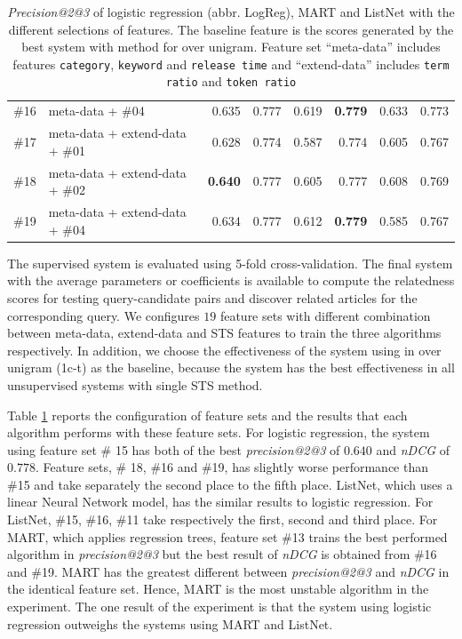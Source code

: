 \begin{table}[!hbt]
{\begin{tabularx}{1\textwidth}{lX|rr|rr|rr}
\#16 & meta-data + \#04 & 0.635 & 0.777 & 0.619 & \textbf{0.779} & 0.633 & 0.773\\
\#17 & meta-data + extend-data + \#01 & 0.628 & 0.774 & 0.587 & 0.774 & 0.605 & 0.767\\
\#18 & meta-data + extend-data + \#02 & \textbf{0.640} &  0.777 & 0.605 & 0.777 & 0.608 & 0.769\\
\#19 & meta-data + extend-data + \#04 & 0.634 & 0.777 & 0.612 & \textbf{0.779} & 0.585 & 0.767 \\ \hline
\end{tabularx}
}
\caption[\textit{Precision@2@3} and \textit{nDCG} of logistic regression, MART and ListNet with the different selections of features in 5-fold cross validation]{\textit{Precision@2@3} of logistic regression (abbr. LogReg), MART and ListNet with the different selections of features. The baseline feature is the scores generated by the best system with method \tfidf{} for \icontent{} over unigram. Feature set ``meta-data'' includes features \texttt{category}, \texttt{keyword} and \texttt{release time} and ``extend-data'' includes \texttt{term ratio} and \texttt{token ratio}}
\label{tab:supervised}
\end{table}


The supervised system is evaluated using 5-fold cross-validation. The final system with the average parameters or coefficients is available to compute the relatedness scores for testing query-candidate pairs and discover related articles for the corresponding query. We configures $19$ feature sets with different combination between meta-data, extend-data and STS features to train the three algorithms  respectively. In addition, we choose the effectiveness of the system using \tfidf{} in \icontent{} over unigram (1c-t) as the baseline, because the system has the best effectiveness in all unsupervised systems with single STS method. 

Table \ref{tab:supervised} reports the configuration of feature sets and the results that each algorithm performs with these feature sets. For logistic regression, the system using feature set \# 15 has both of the best \textit{precision@2@3} of $0.640$ and \textit{nDCG} of $0.778$. Feature sets, \# 18, \#16 and \#19, has slightly worse performance than \#15 and take separately the second place to the fifth place. ListNet, which uses a linear Neural Network model, has the similar results to logistic regression. For ListNet, \#15, \#16, \#11 take respectively the first, second and third place. For MART, which applies regression trees, feature set \#13 trains the best performed algorithm in \textit{precision@2@3} but the best result of \textit{nDCG} is obtained from \#16 and \#19. MART has the greatest different between \textit{precision@2@3} and \textit{nDCG} in the identical feature set. Hence, MART is the most unstable algorithm in the experiment. The one result of the experiment is that the system using logistic regression outweighs the systems using MART and ListNet.


